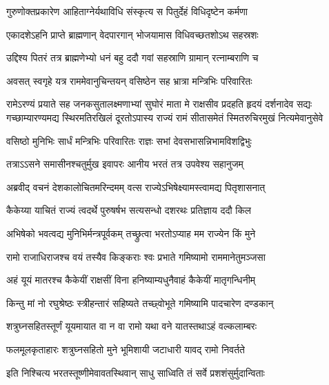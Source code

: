 \twolineshloka
{गुरुणोक्तप्रकारेण आहिताग्नेर्यथाविधि}
{संस्कृत्य स पितुर्देहं विधिदृष्टेन कर्मणा} %

\twolineshloka
{एकादशेऽहनि प्राप्ते ब्राह्मणान् वेदपारगान्}
{भोजयामास विधिवच्छतशोऽथ सहस्रशः} %

\twolineshloka
{उद्दिश्य पितरं तत्र ब्राह्मणेभ्यो धनं बहु}
{ददौ गवां सहस्राणि ग्रामान् रत्नाम्बराणि च} %

\twolineshloka
{अवसत् स्वगृहे यत्र राममेवानुचिन्तयन्}
{वसिष्ठेन सह भ्रात्रा मन्त्रिभिः परिवारितः} %

\fourlineindentedshloka
{रामेऽरण्यं प्रयाते सह जनकसुतालक्ष्मणाभ्यां सुघोरं}
{माता मे राक्षसीव प्रदहति हृदयं दर्शनादेव सद्यः}
{गच्छाम्यारण्यमद्य स्थिरमतिरखिलं दूरतोऽपास्य राज्यं}
{रामं सीतासमेतं स्मितरुचिरमुखं नित्यमेवानुसेवे} %





\twolineshloka
{वसिष्ठो मुनिभिः सार्धं मन्त्रिभिः परिवारितः}
{राज्ञः सभां देवसभासन्निभामविशद्विभुः} %

\twolineshloka
{तत्राऽऽसने समासीनश्चतुर्मुख इवापरः}
{आनीय भरतं तत्र उपवेश्य सहानुजम्} %

\twolineshloka
{अब्रवीद् वचनं देशकालोचितमरिन्दमम्}
{वत्स राज्येऽभिषेक्ष्यामस्त्वामद्य पितृशासनात्} %

\twolineshloka
{कैकेय्या याचितं राज्यं त्वदर्थे पुरुषर्षभ}
{सत्यसन्धो दशरथः प्रतिज्ञाय ददौ किल} %

\twolineshloka
{अभिषेको भवत्वद्य मुनिभिर्मन्त्रपूर्वकम्}
{तच्छ्रुत्वा भरतोऽप्याह मम राज्येन किं मुने} %

\twolineshloka
{रामो राजाधिराजश्च वयं तस्यैव किङ्कराः}
{श्वः प्रभाते गमिष्यामो राममानेतुमञ्जसा} %

\twolineshloka
{अहं यूयं मातरश्च कैकेयीं राक्षसीं विना}
{हनिष्याम्यधुनैवाहं कैकेयीं मातृगन्धिनीम्} %

\twolineshloka
{किन्तु मां नो रघुश्रेष्ठः स्त्रीहन्तारं सहिष्यते}
{तच्छ्वोभूते गमिष्यामि पादचारेण दण्डकान्} %

\twolineshloka
{शत्रुघ्नसहितस्तूर्णं यूयमायात वा न वा}
{रामो यथा वने यातस्तथाऽहं वल्कलाम्बरः} %

\twolineshloka
{फलमूलकृताहारः शत्रुघ्नसहितो मुने}
{भूमिशायी जटाधारी यावद् रामो निवर्तते} %

\twolineshloka
{इति निश्चित्य भरतस्तूष्णीमेवावतस्थिवान्}
{साधु साध्विति तं सर्वे प्रशशंसुर्मुदान्विताः} %

